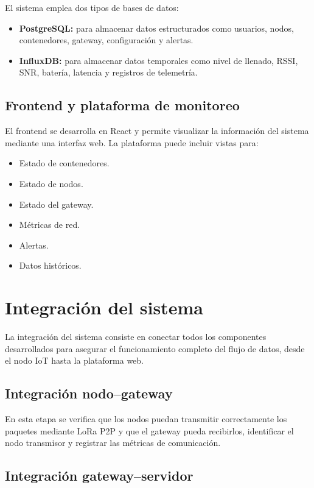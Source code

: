 El sistema emplea dos tipos de bases de datos:

\begin{itemize}
    \item \textbf{PostgreSQL:} para almacenar datos estructurados como usuarios, nodos, contenedores, gateway, configuración y alertas.
    \item \textbf{InfluxDB:} para almacenar datos temporales como nivel de llenado, RSSI, SNR, batería, latencia y registros de telemetría.
\end{itemize}

\subsection{Frontend y plataforma de monitoreo}

El frontend se desarrolla en React y permite visualizar la información del sistema mediante una interfaz web. La plataforma puede incluir vistas para:

\begin{itemize}
    \item Estado de contenedores.
    \item Estado de nodos.
    \item Estado del gateway.
    \item Métricas de red.
    \item Alertas.
    \item Datos históricos.
\end{itemize}

\section{Integración del sistema}

La integración del sistema consiste en conectar todos los componentes desarrollados para asegurar el funcionamiento completo del flujo de datos, desde el nodo IoT hasta la plataforma web.

\subsection{Integración nodo--gateway}

En esta etapa se verifica que los nodos puedan transmitir correctamente los paquetes mediante LoRa P2P y que el gateway pueda recibirlos, identificar el nodo transmisor y registrar las métricas de comunicación.

\subsection{Integración gateway--servidor}

